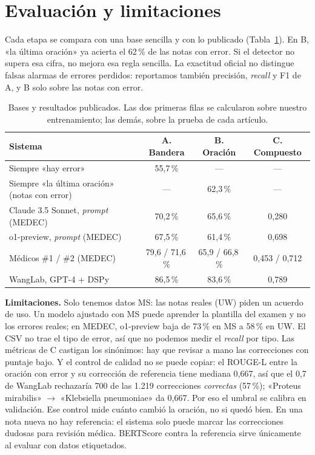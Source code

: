 \documentclass[11pt,a4paper]{article}
\begin{document}
\section{Evaluación y limitaciones}\label{sec:eval}

Cada etapa se compara con una base sencilla y con lo publicado (Tabla~\ref{tab:referencia}). En B, «la última
oración» ya acierta el 62\,\% de las notas con error. Si el detector no supera esa cifra, no mejora esa regla
sencilla. La exactitud oficial no distingue falsas alarmas de errores perdidos: reportamos también precisión,
\emph{recall} y F1 de A, y B solo sobre las notas con error.

\begin{table}[H]
\centering\small
\caption{Bases y resultados publicados. Las dos primeras filas se calcularon sobre nuestro entrenamiento; las
demás, sobre la prueba de cada artículo.}
\label{tab:referencia}
\begin{tabular}{lccc}
\toprule
Sistema & A. Bandera & B. Oración & C. Compuesto \\
\midrule
Siempre «hay error» & 55,7\,\% & --- & --- \\
Siempre «la última oración» (notas con error) & --- & 62,3\,\% & --- \\
Claude 3.5 Sonnet, \emph{prompt} (MEDEC) & 70,2\,\% & 65,6\,\% & 0,280 \\
o1-preview, \emph{prompt} (MEDEC) & 67,5\,\% & 61,4\,\% & 0,698 \\
Médicos \#1 / \#2 (MEDEC) & 79,6 / 71,6\,\% & 65,9 / 66,8\,\% & 0,453 / 0,712 \\
WangLab, GPT-4 + DSPy & 86,5\,\% & 83,6\,\% & 0,789 \\
\bottomrule
\end{tabular}
\end{table}

\textbf{Limitaciones.} Solo tenemos datos MS: las notas reales (UW) piden un acuerdo de uso. Un modelo ajustado con
MS puede aprender la plantilla del examen y no los errores reales; en MEDEC, o1-preview baja de 73\,\% en MS a
58\,\% en UW. El CSV no trae el tipo de error, así que no podemos medir el \emph{recall} por tipo. Las
métricas de C castigan los sinónimos: hay que revisar a mano las correcciones con puntaje bajo. Y el control de
calidad no se puede copiar: el ROUGE-L entre la oración con error y su corrección de referencia tiene mediana 0,667,
así que el 0,7 de WangLab rechazaría 700 de las 1.219 correcciones \emph{correctas} (57\,\%); «Proteus mirabilis»
$\rightarrow$ «Klebsiella pneumoniae» da 0,667. Por eso el umbral se calibra en validación. Ese control mide cuánto
cambió la oración, no si quedó bien. En una nota nueva no hay referencia: el sistema solo puede marcar las correcciones
dudosas para revisión médica. BERTScore contra la referencia sirve únicamente al evaluar con datos etiquetados.
\end{document}
